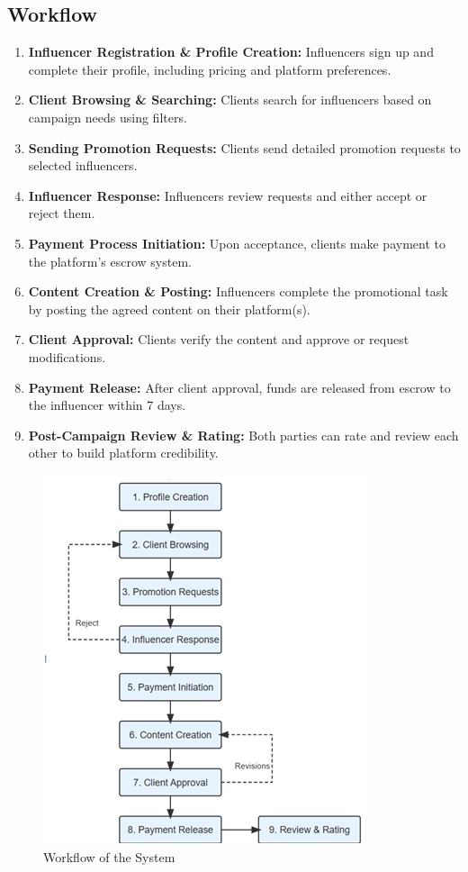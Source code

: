 \begin{justify}
\section{Workflow}
\begin{enumerate}
\item \textbf{	Influencer Registration & Profile Creation: }Influencers sign up and complete their profile, including pricing and platform preferences.
\item 	\textbf{Client Browsing & Searching:} Clients search for influencers based on campaign needs using filters.
\item 	\textbf{Sending Promotion Requests:} Clients send detailed promotion requests to selected influencers.
\item 	\textbf{Influencer Response:} Influencers review requests and either accept or reject them.
\item 	\textbf{Payment Process Initiation:} Upon acceptance, clients make payment to the platform’s escrow system.
\item 	\textbf{Content Creation & Posting:} Influencers complete the promotional task by posting the agreed content on their platform(s).
\item 	\textbf{Client Approval:} Clients verify the content and approve or request modifications.
\item 	\textbf{Payment Release:} After client approval, funds are released from escrow to the influencer within 7 days.
\item \textbf{	Post-Campaign Review & Rating:} Both parties can rate and review each other to build platform credibility.
\end{enumerate}
\begin{figure}[H]
    \centering
    \includegraphics[height=0.4\textheight]{Chapters/Screenshot 2025-05-18 193856.png}
    \caption{Workflow of the System}
    \label{fig:system-workflow}
\end{figure}

\end{justify}
